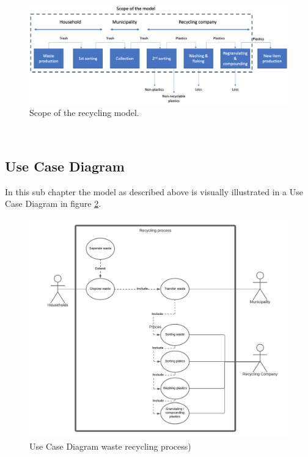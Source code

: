 \begin{figure}[H]
    \centering
        \captionsetup{width=\linewidth}
        \includegraphics[width=1\linewidth]{Images/model scope.png}
        \caption{Scope of the recycling model.}
    \label{fig:Scope of the recycling model.}
\end{figure}\\

\subsection{Use Case Diagram}
\noindent In this sub chapter the model as described above is visually illustrated in a Use Case Diagram in figure \ref{fig:Use_Case}.

\begin{figure}[H]
    \centering
        \captionsetup{width=\linewidth}
        \includegraphics[width=1\linewidth]{Images/UML for recycling system - Use case.png}
        \caption{Use Case Diagram waste recycling process)}
    \label{fig:Use_Case}
\end{figure}

